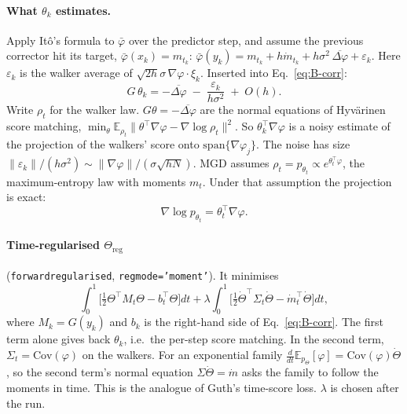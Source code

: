 \documentclass[11pt]{article}
\newcommand{\E}{\mathbb{E}}
\newcommand{\code}[1]{\texttt{#1}}
\renewcommand{\_}{\origunderscore\allowbreak}
\begin{document}
\paragraph{What $\theta_k$ estimates.} Apply It\^o's formula to $\bar\varphi$ over the
predictor step, and assume the previous corrector hit its target,
$\bar\varphi(x_k)=m_{t_k}$:
$\bar\varphi(y_k)=m_{t_k}+h\dot m_{t_k}+h\sigma^2\,\overline{\Delta\varphi}+\varepsilon_k$.
Here $\varepsilon_k$ is the walker average of $\sqrt{2h}\sigma\,\nabla\varphi\cdot\xi_k$.
Inserted into Eq.~\ref{eq:B-corr}:
\begin{equation}
  G\,\theta_k=-\overline{\Delta\varphi}\;-\;\frac{\varepsilon_k}{h\sigma^2}\;+\;O(h).
  \label{eq:B-sm}
\end{equation}
Write $\rho_t$ for the walker law. $G\theta=-\overline{\Delta\varphi}$ are the normal equations of Hyv\"arinen score
matching, $\min_\theta\E_{\rho_t}\lVert\theta^\top\nabla\varphi-\nabla\log\rho_t\rVert^2$.
So $\theta_k^\top\nabla\varphi$ is a noisy estimate of the projection of the
walkers' score onto $\mathrm{span}\{\nabla\varphi_j\}$. The noise has size
$\lVert\varepsilon_k\rVert/(h\sigma^2)\sim\lVert\nabla\varphi\rVert/(\sigma\sqrt{hN})$.
MGD assumes $\rho_t=p_{\theta_t}\propto e^{\theta_t^\top\varphi}$, the maximum-entropy law with moments $m_t$.
Under that assumption the projection is exact:
\begin{equation}
  \nabla\log p_{\theta_t}=\theta_t^\top\nabla\varphi .
  \label{eq:B-score}
\end{equation}

\paragraph{Time-regularised $\Theta_{\mathrm{reg}}$} (\code{forward\_regularised},
\code{reg\_mode='moment'}). It minimises
\begin{equation}
  \int_0^1\!\Big[\tfrac12\Theta^\top M_t\Theta-b_t^\top\Theta\Big]dt
  +\lambda\int_0^1\!\Big[\tfrac12\dot\Theta^\top\Sigma_t\dot\Theta-\dot m_t^\top\dot\Theta\Big]dt,
  \label{eq:B-reg}
\end{equation}
where $M_k=G(y_k)$ and $b_k$ is the right-hand side of Eq.~\ref{eq:B-corr}.
The first term alone gives back $\theta_k$, i.e.\ the per-step score matching.
In the second term, $\Sigma_t=\mathrm{Cov}(\varphi)$ on the walkers. For an exponential family
$\tfrac{d}{dt}\E_{p_\Theta}[\varphi]=\mathrm{Cov}(\varphi)\dot\Theta$, so the second term's normal
equation $\Sigma\dot\Theta=\dot m$ asks the family to follow the moments in time.
This is the analogue of Guth's time-score loss. $\lambda$ is chosen after the run.
\end{document}
